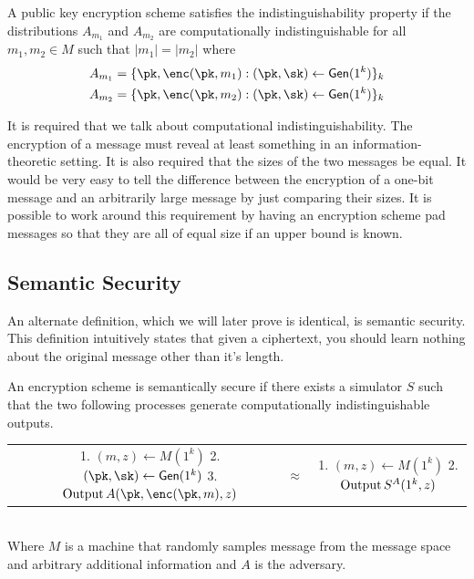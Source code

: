 \documentclass[12pt]{tufte-book}
\newcommand{\gen}{\mathsf{Gen}}
\begin{document}
\begin{definition}[Indistinguishability]
A public key encryption scheme satisfies the indistinguishability property if
the distributions
$A_{m_1}$ and $A_{m_2}$ are computationally indistinguishable for all $m_1, m_2 \in M$
such that $|m_1| = |m_2|$ where
\begin{align*}
A_{m_1} = \{\pk, \enc(\pk, m_1) : (\pk, \sk) \gets \gen(1^k)\}_k \\
A_{m_2} = \{\pk, \enc(\pk, m_2) : (\pk, \sk) \gets \gen(1^k)\}_k
\end{align*}
\end{definition}

It is required that we talk about computational indistinguishability. The encryption
of a message must reveal at least something in an information-theoretic setting.
It is also required that the sizes of the two messages be equal. It would be very
easy to tell the difference between the encryption of a one-bit message and an
arbitrarily large message by just comparing their sizes. It is possible to work around
this requirement by having an encryption scheme pad messages so that they are all
of equal size if an upper bound is known.



\subsection{Semantic Security}
An alternate definition, which we will later prove is identical, is semantic security.
This definition intuitively states that given a ciphertext, you should learn nothing about
the original message other than it's length.

\begin{definition}
An encryption scheme is semantically secure if there exists
a simulator $S$ such that the two following processes generate computationally
indistinguishable outputs.

\begin{tabular}{cccc}
\parbox[t]{2.5cm}{\noindent \\}
&
\parbox[t]{5.8cm}{
1. $(m,z) \gets M(1^k)$ \\
2. $(\pk, \sk) \gets \gen(1^k)$ \\
3. $\text{Output\,} A(\pk, \enc(\pk, m), z)$
}
&
\parbox[t]{1cm}{
\noindent\\
$\approx$
}
&
\parbox[t]{4.5cm}{
1. $(m,z) \gets M(1^k)$ \\
2. $\text{Output\,} S^A(1^k, z)$
}
\end{tabular}
\\

Where $M$ is a machine that randomly samples message from the message space and
arbitrary additional information and $A$ is the adversary.

\end{definition}
\end{document}
